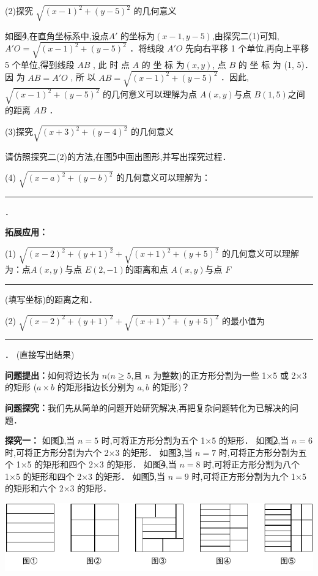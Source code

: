 \documentclass[10pt,a4paper]{ctexart}
\newcommand{\nianfen}[1]{\hspace{-2em}{(#1\textbf{·}\textit{青岛}\textbf{·}23)}}
\newcommand{\ckong}{\rule{14em}{0.5pt}}
\newcommand{\kong}{\rule{4em}{0.5pt}}
\begin{document}
	(2)探究 $\sqrt{(x-1)^2+(y-5)^2}$ 的几何意义
	
	如图\textcircled{4},在直角坐标系中,设点$  A' $ 的坐标为$ (x-1,y-5) $,由探究二(1)可知,
	$ A'O=\sqrt{(x-1)^2+(y-5)^2}$ ．将线段 $ A'O $ 先向右平移 1 个单位,再向上平移 5 个单位,得到线段
	$ AB $ , 此 时 点 $ A $ 的 坐 标 为$  (x,y ) $, 点 $ B $ 的 坐 标 为 (1, 5)． 因 为 $ AB=A'O $ , 所 以
	$AB=\sqrt{(x-1)^2+(y-5)^2}$ ．因此, $\sqrt{(x-1)^2+(y-5)^2}$ 的几何意义可以理解为点 $ A(x,y) $与点
	$ B(1,5) $之间的距离 $ AB $ ．
	
	(3)探究$\sqrt{(x+3)^2+(y-4)^2}$ 的几何意义
	
	请仿照探究二(2)的方法,在图\textcircled{5}中画出图形,并写出探究过程．
	
	\rule{0em}{3em}
	
	(4) $\sqrt{(x-a)^2+(y-b)^2}$ 的几何意义可以理解为：\ckong．
	
	\textbf{拓展应用：}
	
	(1) $\sqrt{(x-2)^2+(y+1)^2}+\sqrt{(x+1)^2+(y+5)^2}$ 的几何意义可以理解为：点$  A(x,y) $与点
	$ E (2,-1) $的距离和点 $ A(x,y) $与点 $ F $\kong (填写坐标)的距离之和．
	
	(2) $\sqrt{(x-2)^2+(y+1)^2}+\sqrt{(x+1)^2+(y+5)^2}$ 的最小值为\kong． (直接写出结果)
	
	\mbox{}
	
	\nianfen{2016}
	
	\textbf{问题提出：}如何将边长为 $ n(n\geq 5 $,且 $ n $ 为整数)的正方形分割为一些 1×5 或 2×3 的矩形
	($ a×b $ 的矩形指边长分别为 $ a,b $ 的矩形)？
	
	\textbf{问题探究：}我们先从简单的问题开始研究解决,再把复杂问题转化为已解决的问题．
	
	\textbf{探究一：}
	如图\textcircled{1},当 $ n=5 $ 时,可将正方形分割为五个 1×5 的矩形．
	如图\textcircled{2},当 $ n=6 $ 时,可将正方形分割为六个 2×3 的矩形．
	如图\textcircled{3},当 $ n=7 $ 时,可将正方形分割为五个 1×5 的矩形和四个 2×3 的矩形．
	如图\textcircled{4},当 $ n=8 $ 时,可将正方形分割为八个 1×5 的矩形和四个 2×3 的矩形．
	如图\textcircled{5},当 $ n=9 $ 时,可将正方形分割为九个 1×5 的矩形和六个 2×3 的矩形．
	
	\begin{center}
		\includegraphics[width=0.9\linewidth]{23/2016a}
	\end{center}
	
\end{document}
